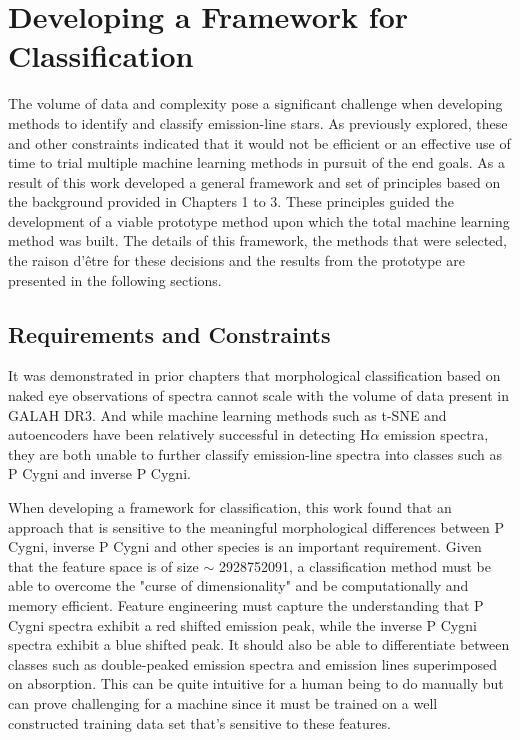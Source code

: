\chapter{Developing a Framework for Classification}

The volume of data and complexity pose a significant challenge when developing methods to identify and classify emission-line stars. As previously explored, these and other constraints indicated that it would not be efficient or an effective use of time to trial multiple machine learning methods in pursuit of the end goals. As a result of this work developed a general framework and set of principles based on the background provided in Chapters 1 to 3. These principles guided the development of a viable prototype method upon which the total machine learning method was built. The details of this framework, the methods that were selected, the raison d'être for these decisions and the results from the prototype are presented in the following sections.

\section{Requirements and Constraints}

It was demonstrated in prior chapters that morphological classification based on naked eye observations of spectra cannot scale with the volume of data present in GALAH DR3. And while machine learning methods such as t-SNE and autoencoders \citep{traven2017galah, vcotar2021galah} have been relatively successful in detecting H$\alpha$ emission spectra, they are both unable to further classify emission-line spectra into classes such as P Cygni and inverse P Cygni.

When developing a framework for classification, this work found that an approach that is sensitive to the meaningful morphological differences between P Cygni, inverse P Cygni and other species is an important requirement. Given that the feature space is of size $\sim$ \num[round-precision=2,round-mode=figures, scientific-notation=true]{2928752091}, a classification method must be able to overcome the "curse of dimensionality" and be computationally and memory efficient. Feature engineering must capture the understanding that P Cygni spectra exhibit a red shifted emission peak, while the inverse P Cygni spectra exhibit a blue shifted peak. It should also be able to differentiate between classes such as double-peaked emission spectra and emission lines superimposed on absorption. This can be quite intuitive for a human being to do manually but can prove challenging for a machine since it must be trained on a well constructed training data set that's sensitive to these features. 

